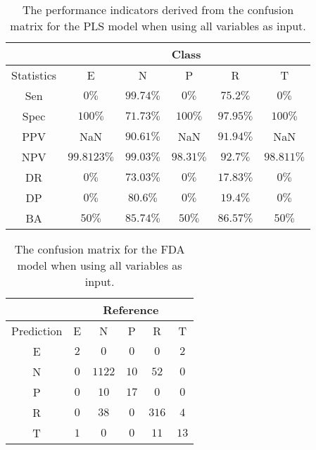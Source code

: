 \begin{table}[!ht]
	\centering
	\begin{tabular}{|c|c|c|c|c|c|}
		\hline
		 & \multicolumn{5}{c|}{Class} \\ \hline
		Statistics & E & N & P & R & T \\ \hline
		Sen & $0\%$ & $99.74\%$ & $0\%$ & $75.2\%$ & $0\%$ \\ \hline
		Spec & $100\%$ & $71.73\%$ & $100\%$ & $97.95\%$ & $100\%$ \\ \hline
		PPV & NaN & $90.61\%$ & NaN & $91.94\%$ & NaN \\ \hline
		NPV & $99.8123\%$ & $99.03\%$ & $98.31\%$ & $92.7\%$ & $98.811\%$ \\ \hline
		DR & $0\%$ & $73.03\%$ & $0\%$ & $17.83\%$ & $0\%$ \\ \hline
		DP & $0\%$ & $80.6\%$ & $0\%$ & $19.4\%$ & $0\%$ \\ \hline
		BA & $50\%$ & $85.74\%$ & $50\%$ & $86.57\%$ & $50\%$ \\ \hline
	\end{tabular}
	\caption{The performance indicators derived from the confusion matrix for the PLS model when using all variables as input.}
	\label{tab:cs:reverse:all:pls}
\end{table}

\begin{table}[!ht]
	\centering
	\begin{tabular}{|c|c|c|c|c|c|}
		\hline
		 & \multicolumn{5}{|c|}{Reference} \\ \hline
		 Prediction & E & N & P & R & T \\ \hline
		 E & $2$ & $0$ & $0$ & $0$ & $2$ \\ \hline
		 N & $0$ & $1122$ & $10$ & $52$ & $0$ \\ \hline
		 P & $0$ & $10$ & $17$ & $0$ & $0$ \\ \hline
		 R & $0$ & $38$ & $0$ & $316$ & $4$ \\ \hline
		 T & $1$ & $0$ & $0$ & $11$ & $13$ \\ \hline
	\end{tabular}
	\caption{The confusion matrix for the FDA model when using all variables as input.}
	\label{tab:cm:all:fda}
\end{table}

